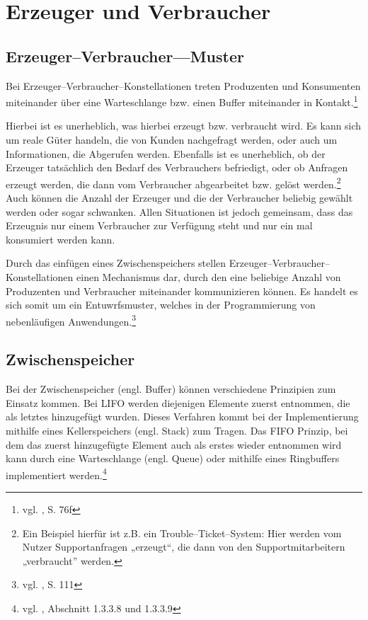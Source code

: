 
\section{Erzeuger und Verbraucher} %
\label{sec:erzeuger_und_verbraucher}

\subsection{Erzeuger–Verbraucher—Muster} %
\label{sub:erzeuger_verbraucher_muster}

Bei Erzeuger–Verbraucher–Konstellationen treten Produzenten und Konsumenten miteinander über eine Warteschlange bzw. einen Buffer miteinander in Kontakt.\footnote{vgl. \cite{osdi}, S. 76f}

Hierbei ist es unerheblich, was hierbei erzeugt bzw. verbraucht wird. Es kann sich um reale Güter handeln, die von Kunden nachgefragt werden, oder auch um Informationen, die Abgerufen werden. Ebenfalls ist es unerheblich, ob der Erzeuger tatsächlich den Bedarf des Verbrauchers befriedigt, oder ob Anfragen erzeugt werden, die dann vom Verbraucher abgearbeitet bzw. gelöst werden.\footnote{Ein Beispiel hierfür ist z.B. ein Trouble–Ticket–System: Hier werden vom Nutzer Supportanfragen „erzeugt“, die dann von den Supportmitarbeitern „verbraucht” werden.} 
Auch können die Anzahl der Erzeuger und die der Verbraucher beliebig gewählt werden oder sogar schwanken. Allen Situationen ist jedoch gemeinsam, dass das Erzeugnis nur einem Verbraucher zur Verfügung steht und nur ein mal konsumiert werden kann.

Durch das einfügen eines Zwischenspeichers stellen Erzeuger–\-Verbraucher–\-Kon\-stel\-lation\-en einen Mechanismus dar, 
durch den eine beliebige Anzahl von Produzenten und Verbraucher miteinander kommunizieren können.
Es handelt es sich somit um ein Entuwrfsmuster, welches in der Programmierung von nebenläufigen Anwendungen.\footnote{vgl. \cite{openmp}, S. 111} 


\subsection{Zwischenspeicher} %
\label{sub:buffer}

Bei der Zwischenspeicher (engl. Buffer) können verschiedene Prinzipien zum Einsatz kommen. Bei \ac{LIFO} werden diejenigen Elemente zuerst entnommen, die als letztes hinzugefügt wurden. Dieses Verfahren kommt bei der Implementierung mithilfe eines Kellerspeichers (engl. Stack) zum Tragen.  Das \ac{FIFO} Prinzip, bei dem das zuerst hinzugefügte Element auch als erstes wieder entnommen wird kann durch eine Warteschlange (engl. Queue) oder mithilfe eines Ringbuffers implementiert werden.\footnote{vgl. \cite{algorithms}, Abschnitt 1.3.3.8 und 1.3.3.9}

